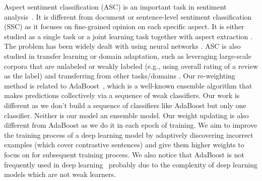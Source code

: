 Aspect sentiment classification (ASC) \cite{hu2004mining} is an important task in sentiment analysis~\cite{pang2002thumbs,liu2015sentiment}. It is different from document or sentence-level sentiment classification (SSC) \cite{pang2002thumbs,kim2014convolutional,he2011self,he2011automatically} as it focuses on fine-grained opinion on each specific aspect. It is either studied as a single task or a joint learning task together with aspect extraction \cite{wang2017coupled,li2017deep,li2018unified}. The problem has been widely dealt with using neural networks \cite{dong2014adaptive,nguyen-shirai-2015-phrasernn,li2018transformation}.
ASC is also studied in transfer learning or domain adaptation, such as leveraging large-scale corpora that are unlabeled or weakly labeled (e.g., using overall rating of a review as the label) \cite{xu2019bert,he-EtAl:2018} and transferring from other tasks/domains \cite{li2018exploiting,wang2018lifelong,wang2018target}. 
Our re-weighting method is related to AdaBoost~\cite{freund1997decision}, which is a well-known ensemble algorithm that makes predictions collectively via a sequence of weak classifiers. 
Our work is different as we don’t build a sequence of classifiers like AdaBoost but only one classifier. Neither is our model an ensemble model. Our weight updating is also different from AdaBoost as we do it in each epoch of training.
We aim to improve the training process of a deep learning model by adaptively discovering incorrect examples (which cover contrastive sentences) and give them higher weights to focus on for subsequent training process. 
We also notice that AdaBoost is not frequently used in deep learning~\cite{schwenk2000boosting,mosca2017deep} probably due to the complexity of deep learning models which are not weak learners.


